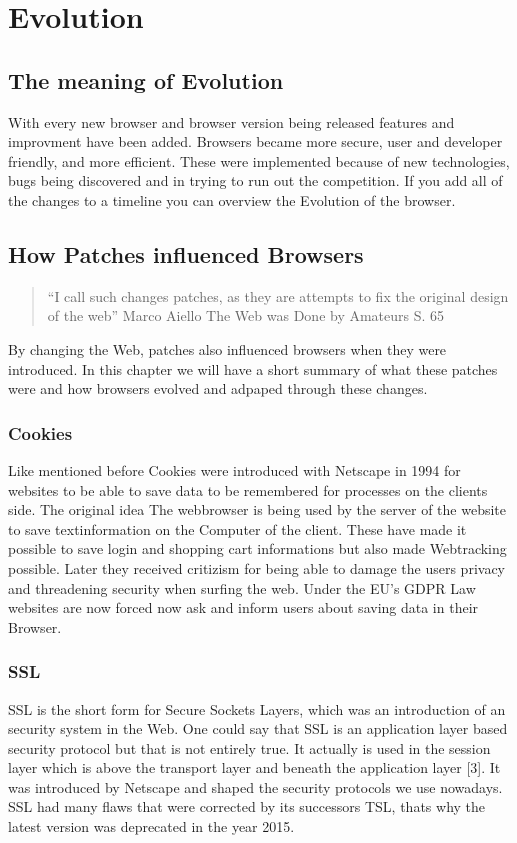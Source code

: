 \documentclass[runningheads]{llncs}
\begin{document}
	\section{Evolution}
		\subsection{The meaning of Evolution}
		With every new browser and browser version being released features and improvment have been added. Browsers became more secure, user and developer friendly, and more efficient. These were implemented because of new technologies, bugs being discovered and in trying to run out the competition. If you add all of the changes to a timeline you can overview the Evolution of the browser.
		\subsection{How Patches influenced Browsers}
			\begin{quote}``I call such changes patches, as they are attempts to fix the original design of the web'' Marco Aiello The Web was Done by Amateurs S. 65 \end{quote}
		By changing the Web, patches also influenced browsers when they were introduced. In this chapter we will have a short summary of what these patches were and how browsers evolved and adpaped through these changes.
			\subsubsection{Cookies}
			\leavevmode\newline
			Like mentioned before Cookies were introduced with Netscape in 1994 for websites to be able to save data to be remembered for processes on the clients side. The original idea The webbrowser is being used by the server of the website to save textinformation on the Computer of the client. These have made it possible to save login and shopping cart informations but also made Webtracking possible. Later they received critizism for being able to damage the users privacy and threadening security when surfing the web. Under the EU's GDPR Law websites are now forced now ask and inform users about saving data in their Browser.
			\subsubsection{SSL}
			\leavevmode\newline
			SSL is the short form for Secure Sockets Layers, which was an introduction of an security system in the Web. One could say that SSL is an application layer based security protocol but that is not entirely true. It actually is used in the session layer which is above the transport layer and beneath the application layer [3]. It was introduced by Netscape and shaped the security protocols we use nowadays. SSL had many flaws that were corrected by its successors TSL, thats why the latest version was deprecated in the year 2015.
\end{document}
